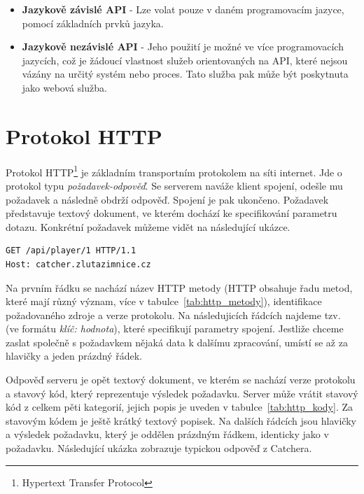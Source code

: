 \begin{itemize}
  \item \textbf{Jazykově závislé API} - Lze volat pouze v daném programovacím jazyce, pomocí základních prvků jazyka.
  \item \textbf{Jazykově nezávislé API} - Jeho použití je možné ve více programovacích jazycích, což je žádoucí vlastnost
    služeb orientovaných na API, které nejsou vázány na určitý systém nebo proces.
    Tato služba pak může být poskytnuta jako webová služba.
\end{itemize}

\section{Protokol HTTP}

Protokol HTTP\footnote{Hypertext Transfer Protocol} je základním transportním protokolem na síti internet.
Jde o protokol typu \textit{požadavek-odpověď}. Se serverem naváže klient spojení,
odešle mu požadavek a následně obdrží odpověď. Spojení je pak ukončeno.
Požadavek představuje textový dokument, ve kterém dochází ke specifikování parametru dotazu.
Konkrétní požadavek můžeme vidět na následující ukázce.

\begingroup
\fontsize{9.5pt}{11pt}\selectfont
\begin{verbatim}
GET /api/player/1 HTTP/1.1
Host: catcher.zlutazimnice.cz
\end{verbatim}
\endgroup

Na prvním řádku se nachází název HTTP metody (HTTP obsahuje řadu metod, které mají různý význam, více v tabulce~\ref{tab:http_metody}),
identifikace požadovaného zdroje a verze protokolu. Na následujicích řádcích najdeme tzv.~
(ve formátu \textit{klíč: hodnota}), které specifikují parametry spojení. Jestliže chceme zaslat společně s požadavkem
nějaká data k dalšímu zpracování, umístí se až za hlavičky a jeden prázdný řádek.

Odpověď serveru je opět textový dokument, ve kterém se nachází verze protokolu a stavový kód,
který reprezentuje výsledek požadavku. Server může vrátit stavový kód z celkem pěti kategorií,
jejich popis je uveden v tabulce~\ref{tab:http_kody}. Za stavovým kódem je ještě krátký textový popisek. Na dalších
řádcích jsou hlavičky a výsledek požadavku, který je oddělen prázdným řádkem, identicky jako v požadavku.
Následující ukázka zobrazuje typickou odpověď z Catchera. 

